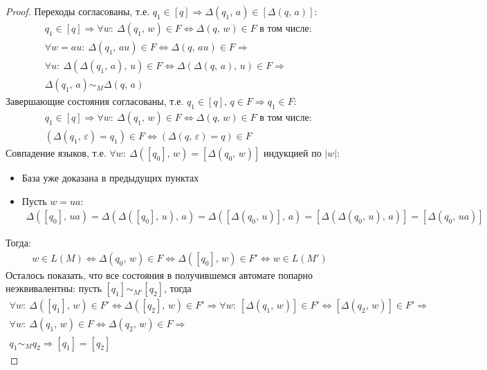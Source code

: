 \documentclass[a4paper,12pt]{article}
\theoremstyle{plain}
\theoremstyle{definition}
\theoremstyle{remark}
\begin{document}
\begin{proof}
	Переходы согласованы, т.е. $q_1 \in [q] \Rightarrow \Delta(q_1,\, a) \in [\Delta(q,\,a)]$:
	\begin{align*}
		q_1 \in [q] \Rightarrow \forall w:\: \Delta(q_1,\,w) \in F \Leftrightarrow \Delta(q,\,w) \in F \text{ в том числе: } \\
		\forall w = au:\: \Delta(q_1,\,au) \in F \Leftrightarrow \Delta(q,\, au) \in F \Rightarrow                           \\
		\forall u:\: \Delta(\Delta(q_1,\,a),\,u) \in F \Leftrightarrow \Delta(\Delta(q,\,a),\,u) \in F \Rightarrow           \\
		\Delta(q_1,\,a) \sim_M \Delta(q,\,a)
	\end{align*}
	Завершающие состояния согласованы, т.е. $q_1 \in [q],\, q \in F \Rightarrow q_1 \in F$:
	\begin{align*}
		q_1 \in [q] \Rightarrow \forall w:\: \Delta(q_1,\,w) \in F \Leftrightarrow \Delta(q,\,w) \in F \text{ в том числе: } \\
		(\Delta(q_1,\,\varepsilon) = q_1) \in F \Leftrightarrow (\Delta(q,\, \varepsilon) = q) \in F
	\end{align*}
	Совпадение языков, т.е. $\forall w :\: \Delta([q_0],\, w) = [\Delta(q_0,\,w)]$ индукцией по $|w|$:
	\begin{itemize}
		\item База уже доказана в предыдущих пунктах
		\item Пусть $w = ua$:
		      \begin{align*}
			      \Delta([q_0],\, ua) = \Delta(\Delta([q_0],\, u),\, a) = \Delta([\Delta(q_0,\, u)],\, a) = [\Delta(\Delta(q_0,\,u),\, a)] = [\Delta(q_0,\,ua)]
		      \end{align*}
	\end{itemize}
	Тогда:
	\begin{align*}
		w \in L(M) \Leftrightarrow \Delta(q_0,\, w) \in F \Leftrightarrow \Delta([q_0],\, w) \in F' \Leftrightarrow w \in L(M')
	\end{align*}
	Осталось показать, что все состояния в получившемся автомате попарно неэквивалентны: пусть  $[q_1] \sim_{M'} [q_2]$, тогда
	\begin{align*}
		\forall w :\: \Delta([q_1],\, w) \in F' \Leftrightarrow \Delta([q_2],\,w) \in F' \Rightarrow \forall w :\: [\Delta(q_1,\,w)] \in F' \Leftrightarrow [\Delta(q_2,\,w)] \in F' \Rightarrow \\
		\forall w :\: \Delta(q_1,\, w) \in F \Leftrightarrow \Delta(q_2,\,w) \in F \Rightarrow                                                                                                   \\
		q_1 \sim_M q_2 \Rightarrow [q_1] = [q_2]
	\end{align*}

\end{proof}
\end{document}
